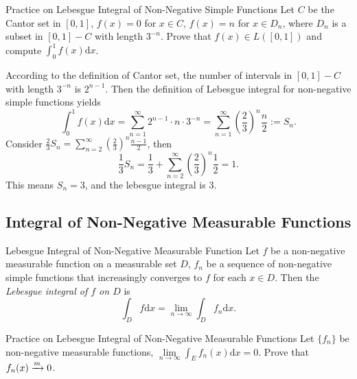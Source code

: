 \begin{example}{Practice on Lebesgue Integral of Non-Negative Simple Functions}{}
  Let $C$ be the Cantor set in $[0, 1]$,
  $f(x) = 0$ for $x \in C$, $f(x) = n$ for $x \in D_n$,
  where $D_n$ is a subset in $[0, 1] - C$ with length $3^{-n}$.
  Prove that $f(x) \in L([0, 1])$ and compute $\int_0^1 f(x)\mathrm{d} x$.
\end{example}

\begin{solution}
  According to the definition of Cantor set,
  the number of intervals in $[0, 1] - C$ with length $3^{-n}$ is $2^{n-1}$.
  Then the definition of Lebesgue integral for non-negative simple functions yields
  \begin{equation}
    \int_0^1 f(x)\mathrm{d} x
    = \sum\limits_{n = 1}^{\infty} 2^{n-1} \cdot n \cdot 3^{-n}
    = \sum\limits_{n = 1}^{\infty} \left( \frac{2}{3} \right)^n \frac{n}{2}
    := S_n.
  \end{equation}
  Consider $\frac{2}{3}S_n = \sum\limits_{n = 2}^{\infty} (\frac{2}{3})^n
  \frac{n-1}{2}$, then
  \begin{equation}
    \frac{1}{3}S_n = \frac{1}{3} + \sum\limits_{n = 2}^{\infty} \left( \frac{2}{3} \right)^n \frac{1}{2}
    = 1.
  \end{equation}
  This means $S_n = 3$, and the lebesgue integral is $3$.
\end{solution}

\subsection{Integral of Non-Negative Measurable Functions}

\begin{definition}{Lebesgue Integral of Non-Negative Measurable Function}{}
  Let $f$ be a non-negative measurable function on a measurable set $D$,
  $f_n$ be a sequence of non-negative simple functions that increasingly
  converges to $f$ for each $x \in D$.
  Then the \emph{Lebesgue integral of $f$ on $D$} is
  \begin{equation}
    \int_D f \mathrm{d} x= \lim \limits _{n \rightarrow \infty} \int_D f_n \mathrm{d} x.
  \end{equation}
\end{definition}

\begin{example}{Practice on Lebesgue Integral of Non-Negative Measurable Functions}{}
  Let $\{f_n\}$ be non-negative measurable functions,
  $\lim \limits _{n \rightarrow \infty} \int_E f_n(x)\mathrm{d} x = 0$.
  Prove that $f_n(x) \xrightarrow{m} 0$.
\end{example}


